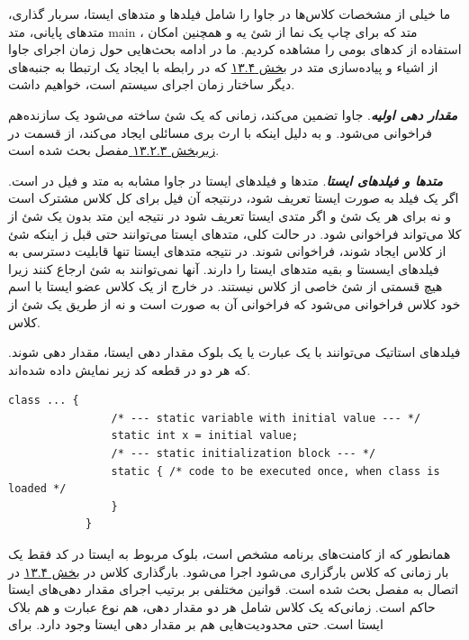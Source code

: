 \documentclass[a4paper,12pt]{report}
\newcommand{\lrInlineMono}[1]{{\color{steelBlue}\lr{\texttt{#1}}}}
\begin{document}
	ما خیلی از مشخصات کلاس‌ها در جاوا را شامل فیلد‌ها و متدهای ایستا،  سربار گذاری، متد‌های پایانی، متد main ، متد 
	 که برای چاپ یک نما از شئ یه و همچنین امکان استفاده از کد‌های بومی را مشاهده کردیم. ما در ادامه بحث‌هایی حول زمان اجرای جاوا از اشیاء و پیاده‌سازی متد 
	  در 
	\hyperref[sec4:chap13]{
	بخش ۱۳.۴} که در رابطه با ایجاد یک ارتبطا به جنبه‌های دیگر ساختار زمان اجرای سیستم است، خواهیم داشت.

	\textbf{\textit{
	مقدار دهی اولیه}}. جاوا تضمین می‌کند، زمانی که یک شئ ساخته می‌شود یک سازنده‌هم فراخوانی می‌شود.
	و به دلیل اینکه با ارث ‌بری مسائلی ایجاد می‌کند، از قسمت در 
	\hyperref[subsec3:sec2:chap13]{
	زیربخش ۱۳.۲.۳ } مفصل بحث شده است.
	
	\textit{\textbf{
	متد‌ها و فیلد‌های ایستا}}. متد‌ها و فیلد‌های ایستا در جاوا مشابه به متد و فیل در 
 است. اگر یک فیلد به صورت ایستا تعریف شود، درنتیجه آن فیل برای کل کلاس مشترک است و نه برای هر یک شئ و اگر متدی ایستا تعریف شود در نتیجه این متد بدون یک شئ از کلا می‌تواند فراخوانی شود. در حالت کلی، متد‌های ایستا می‌توانند حتی قبل ز اینکه  شئ از کلاس ایجاد شوند، فراخوانی شوند. در نتیجه متد‌های ایستا تنها قابلیت دسترسی به فیلد‌های ایسستا و بقیه متد‌های ایستا را دارند. آنها نمی‌توانند به شئ 
 ارجاع کنند زیرا هیچ قسمتی از شئ خاصی از کلاس نیستند. در خارج از یک کلاس عضو ایستا با اسم خود کلاس فراخوانی می‌شود که فراخوانی آن به صورت 
	\lrInlineMono{class\_name.static\_method(args)}
	است و نه از طریق یک شئ از کلاس.
	
	فیلد‌های استاتیک می‌توانند با یک عبارت یا یک بلوک مقدار ‌دهی ایستا، مقدار دهی شوند. که هر دو در قطعه کد زیر نمایش داده شده‌اند.
	
	\begin{latin}
		\small
		\begin{lstlisting}[]
			class ... {
				/* --- static variable with initial value --- */
				static int x = initial value;
				/* --- static initialization block --- */
				static { /* code to be executed once, when class is loaded */
				}
			}
		\end{lstlisting}
	\end{latin}	
	
	همانطور که از کامنت‌های برنامه مشخص است، بلوک مربوط به ایستا در کد فقط یک بار زمانی که کلاس بارگزاری می‌شود اجرا می‌شود. بارگذاری کلاس در 
	\hyperref[sec4:chap13]{
		بخش ۱۳.۴} در اتصال به 
 مفصل بحث شده است. قوانین مختلفی بر برتیب اجرای مقدار دهی‌های ایستا حاکم است. زمانی‌که یک کلاس شامل هر دو مقدار دهی، هم نوع عبارت و هم بلاک ایستا است. حتی محدودیت‌هایی هم بر مقدار دهی ایستا وجود دارد. برای     
	
\end{document}
